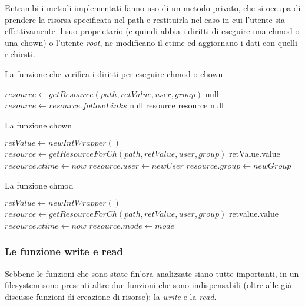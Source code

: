 Entrambi i metodi implementati fanno uso di un metodo privato, che si occupa di prendere la risorsa specificata nel path e restituirla nel caso in cui l'utente sia effettivamente il suo proprietario (e quindi abbia i diritti di eseguire una chmod o una chown) o l'utente \emph{root}, ne modificano il ctime ed aggiornano i dati con quelli richiesti.
\begin{algorithm}
\begin{algorithmic}[5]
\caption{La funzione che verifica i diritti per eseguire chmod o chown}
	\State $resource \gets getResource(path, retValue, user, group)$
		\State \Return null
	\EndIf
		\State $resource \gets resource.followLinks$
			\State \Return null
		\EndIf
	\EndIf
		\State \Return resource
	\EndIf
		\State \Return resource
	\EndIf
	\State \Return null 
\EndFunction
\end{algorithmic}
\end{algorithm}
\begin{algorithm}
\begin{algorithmic}[5]
\caption{La funzione chown}
	\State $retValue \gets new IntWrapper()$
	\State $resource \gets getResourceForCh(path, retValue, user, group)$
		\State \Return retValue.value
	\EndIf
	\State $resource.ctime \gets now$
	\State $resource.user \gets newUser$	
	\State $resource.group \gets newGroup$
	\State {}
\EndFunction
\end{algorithmic}
\end{algorithm}
\begin{algorithm}
\begin{algorithmic}[5]
\caption{La funzione chmod}
	\State $retValue \gets new IntWrapper()$
	\State $resource \gets getResourceForCh(path, retValue, user, group)$
		\State \Return retvalue.value
	\EndIf
	\State $resource.ctime \gets now$
	\State $resource.mode \gets mode$
	\State {}
\EndFunction
\end{algorithmic}
\end{algorithm}
  
\newpage
  
\subsubsection{Le funzione write e read}
Sebbene le funzioni che sono state fin'ora analizzate siano tutte importanti, in un filesystem sono presenti altre due funzioni che sono indispensabili (oltre alle già discusse funzioni di creazione di risorse): la \emph{write} e la \emph{read}.

